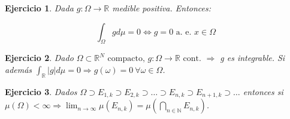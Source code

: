 \documentclass[11pt, a4paper]{article}
\theoremstyle{theorem-style}
\theoremstyle{definition-style}
\newtheorem{ejer}{Ejercicio}[section]
\theoremstyle{remark-style}
\theoremstyle{example-style}
\begin{document}
\begin{ejer}
  Dada $g : \Omega \rightarrow \mathbb R$ medible positiva. Entonces:
  
  $$\int_{\Omega} g d \mu = 0 \Leftrightarrow g = 0 \text{ a. e. } x \in \Omega$$
\end{ejer}

\begin{ejer}
  Dado $\Omega \subset \mathbb R^N \text{ compacto, } g: \Omega \rightarrow \mathbb R \text{ cont. } \Rightarrow$ g es integrable. Si además $\int_{\mathbb R} |g| d \mu = 0 \Rightarrow g(\omega) = 0 \ \forall \omega \in \Omega$.
\end{ejer}

\begin{ejer}
  Dados $\Omega \supset E_{1,k} \supset E_{2,k} \supset \hdots \supset E_{n,k} \supset
  E_{n+1,k} \supset \hdots$ entonces si $\mu(\Omega) < \infty \Rightarrow
  \lim_{n\to\infty} \mu(E_{n,k}) = \mu(\bigcap_{n \in \mathbb N}
  E_{n,k})$. 
\end{ejer}
\end{document}

